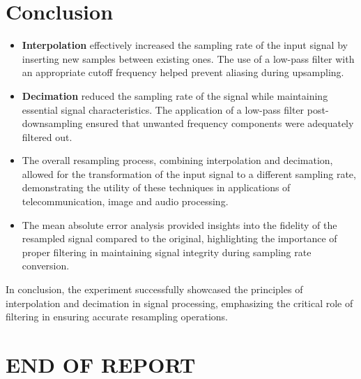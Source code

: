 \documentclass[journal,12pt,onecolumn]{IEEEtran}
\theoremstyle{remark}
\begin{document}
\section{Conclusion}
\begin{itemize}
    \item \textbf{Interpolation} effectively increased the sampling rate of the input signal by inserting new samples between existing ones. The use of a low-pass filter with an appropriate cutoff frequency helped prevent aliasing during upsampling.
    
    \item \textbf{Decimation} reduced the sampling rate of the signal while maintaining essential signal characteristics. The application of a low-pass filter post-downsampling ensured that unwanted frequency components were adequately filtered out.
    
    \item The overall resampling process, combining interpolation and decimation, allowed for the transformation of the input signal to a different sampling rate, demonstrating the utility of these techniques in applications of telecommunication, image and audio processing.
    
    \item The mean absolute error analysis provided insights into the fidelity of the resampled signal compared to the original, highlighting the importance of proper filtering in maintaining signal integrity during sampling rate conversion.
\end{itemize}

In conclusion, the experiment successfully showcased the principles of interpolation and decimation in signal processing, emphasizing the critical role of filtering in ensuring accurate resampling operations.

\section*{END OF REPORT}
\end{document}
